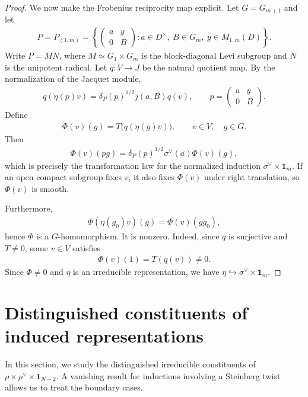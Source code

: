 \documentclass[11pt,leqno]{amsart}
\numberwithin{equation}{section}
\theoremstyle{plain}
\theoremstyle{definition}
\theoremstyle{remark}
\newcommand{\one}{\mathbf{1}}
\begin{document}
\begin{proof}
		We now make the Frobenius reciprocity map explicit.
		Let $G=G_{m+1}$ and let
		\begin{align*}
			P=P_{(1,m)}=
			\left\{
			\begin{pmatrix}a&y\\0&B\end{pmatrix}: a\in D^\times,\ B\in G_m,\ y\in M_{1,m}(D)
			\right\}.
		\end{align*}
		Write $P=MN$, where $M\simeq G_1\times G_m$ is the block-diagonal Levi subgroup and $N$ is the unipotent radical.
		Let $q:V\to J$ be the natural quotient map.
		By the normalization of the Jacquet module,
		\begin{align*}
			q(\eta(p)v)=\delta_P(p)^{1/2}j(a,B)q(v), \qquad p=\begin{pmatrix}a&y\\0&B\end{pmatrix}.
		\end{align*}	
		Define
		\begin{align*}
			\Phi(v)(g)=T\bigl(q(\eta(g)v)\bigr), \qquad v\in V,\quad g\in G.
		\end{align*}
		Then
		\begin{align*}
			\Phi(v)(pg)=\delta_P(p)^{1/2}\sigma^\vee(a)\Phi(v)(g),
		\end{align*}
		which is precisely the transformation law for the normalized induction $\sigma^\vee\times\mathbf1_m$.
		If an open compact subgroup fixes $v$, it also fixes $\Phi(v)$ under right translation, so $\Phi(v)$ is smooth.
		
		Furthermore,
		\begin{align*}
			\Phi(\eta(g_0)v)(g)=\Phi(v)(gg_0),
		\end{align*}
		hence $\Phi$ is a $G$-homomorphism.
		It is nonzero. Indeed, since $q$ is surjective and $T\neq0$, some $v\in V$ satisfies
		\begin{align*}
			\Phi(v)(1)=T(q(v))\neq0.
		\end{align*}
		Since \(\Phi\neq0\) and $\eta$ is an irreducible representation, we have $\eta\hookrightarrow\sigma^\vee\times\mathbf1_m$.
	\end{proof}
	\section{Distinguished constituents of induced representations}
	
	In this section, we study the distinguished irreducible
	constituents of $\rho\times\rho^\vee\times\one_{N-2}$.
	A vanishing result for inductions involving a Steinberg twist
	allows us to treat the boundary cases. 
	
\end{document}
